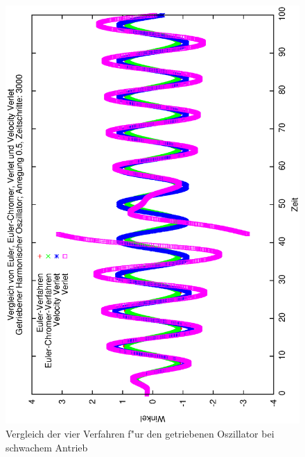 \documentclass[a4paper,12pt]{article}
\begin{document}
\begin{figure}
  \centering
  \includegraphics[width=\textwidth]{vgl-awp-3}
  \caption{Vergleich der vier Verfahren f"ur den getriebenen
    Oszillator bei schwachem Antrieb}
  \label{fig:vgl-awp-1}
\end{figure}
\end{document}
